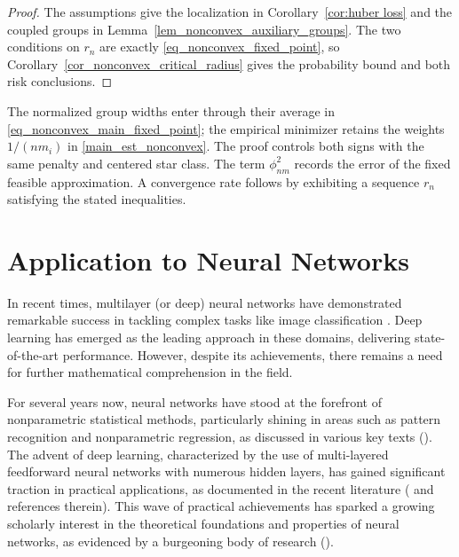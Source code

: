 \documentclass[twoside,11pt]{article}
\newenvironment{revision}{\color{revisionred}}{}
\begin{document}
\begin{revision}
\begin{proof}
The assumptions give the localization in
Corollary~\ref{cor:huber loss} and the coupled groups in
Lemma~\ref{lem_nonconvex_auxiliary_groups}.
The two conditions on $r_n$ are exactly
\eqref{eq_nonconvex_fixed_point}, so
Corollary~\ref{cor_nonconvex_critical_radius} gives the probability
bound and both risk conclusions.
\end{proof}

The normalized group widths enter through their average in
\eqref{eq_nonconvex_main_fixed_point}; the empirical minimizer retains
the weights $1/(nm_i)$ in \eqref{main_est_nonconvex}.
The proof controls both signs with the same penalty and centered
star class. The term $\phi_{nm}^2$ records the error of the fixed
feasible approximation. A convergence rate follows by exhibiting
a sequence $r_n$ satisfying the stated inequalities.
\end{revision}

\section{Application to Neural Networks}

In recent times, multilayer (or deep) neural networks have demonstrated remarkable success in tackling complex tasks like image classification \cite{krizhevsky2017imagenet}. Deep learning has emerged as the leading approach in these domains, delivering state-of-the-art performance. However, despite its achievements, there remains a need for further mathematical comprehension in the field.

For several years now, neural networks have stood at the forefront of nonparametric statistical methods, particularly shining in areas such as pattern recognition and nonparametric regression, as discussed in various key texts (\cite{anthony1999neural, devroye2013probabilistic, gyorfi2002distribution, haykin1998neural,hertz2018introduction}). The advent of deep learning, characterized by the use of multi-layered feedforward neural networks with numerous hidden layers, has gained significant traction in practical applications, as documented in the recent literature (\citep{schmidhuber2015deep} and references therein). This wave of practical achievements has sparked a growing scholarly interest in the theoretical foundations and properties of neural networks, as evidenced by a burgeoning body of research (\cite{schmidhuber2015deep, eldan2016power, elbrachter2021deep, yarotsky2018optimal, yarotsky2020phase, lu2021deep}). 
\end{document}

